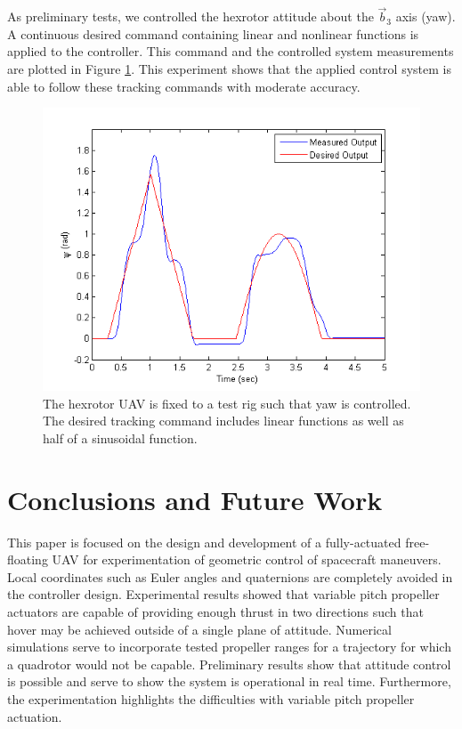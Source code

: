 \documentclass[twocolumn,letterpaper]{IEEEAerospaceCLS}  %
\begin{document}
As preliminary tests, we controlled the hexrotor attitude about the $\vec b_3$ axis (yaw). A continuous desired command containing linear and nonlinear functions is applied to the controller. This command and the controlled system measurements are plotted in Figure \ref{fig:AttitudeControl}. This experiment shows that the applied control system is able to follow these tracking commands with moderate accuracy.

\begin{figure}
\centerline{
	\includegraphics[width=1.0\columnwidth]{Yaw_Test.png}}
\caption{The hexrotor UAV is fixed to a test rig such that yaw is controlled. The desired tracking command includes linear functions as well as half of a sinusoidal function.}
\label{fig:AttitudeControl}
\end{figure}


\section{Conclusions and Future Work}

This paper is focused on the design and development of a fully-actuated free-floating UAV for experimentation of geometric control of spacecraft maneuvers. Local coordinates such as Euler angles and quaternions are completely avoided in the controller design. Experimental results showed that variable pitch propeller actuators are capable of providing enough thrust in two directions such that hover may be achieved outside of a single plane of attitude. Numerical simulations serve to incorporate tested propeller ranges for a trajectory for which a quadrotor would not be capable. Preliminary results show that attitude control is possible and serve to show the system is operational in real time. Furthermore, the experimentation highlights the difficulties with variable pitch propeller actuation.
\end{document}

